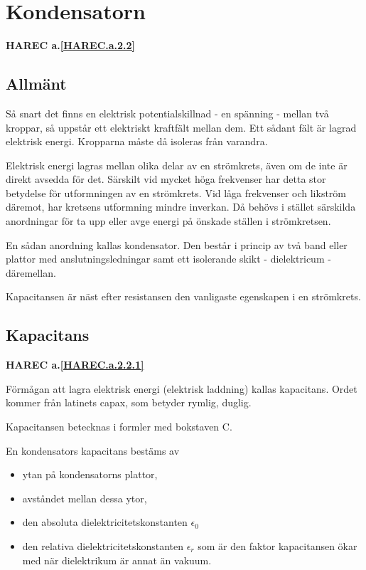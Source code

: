 \section{Kondensatorn}
\textbf{HAREC a.\ref{HAREC.a.2.2}\label{myHAREC.a.2.2}}

\subsection{Allmänt}

Så snart det finns en elektrisk potentialskillnad - en spänning - mellan två
kroppar, så uppstår ett elektriskt kraftfält mellan dem. Ett sådant fält är
lagrad elektrisk energi. Kropparna måste då isoleras från varandra.

Elektrisk energi lagras mellan olika delar av en strömkrets, även om de inte är
direkt avsedda för det. Särskilt vid mycket höga frekvenser har detta stor
betydelse för utformningen av en strömkrets. Vid låga frekvenser och likström
däremot, har kretsens utformning mindre inverkan. Då behövs i stället särskilda
anordningar för ta upp eller avge energi på önskade ställen i strömkretsen.

En sådan anordning kallas kondensator. Den består i princip av två band eller
plattor med anslutningsledningar samt ett isolerande skikt - dielektricum -
däremellan.

Kapacitansen är näst efter resistansen den vanligaste egenskapen i en
strömkrets.

\subsection{Kapacitans}
\textbf{HAREC a.\ref{HAREC.a.2.2.1}\label{myHAREC.a.2.2.1}}

Förmågan att lagra elektrisk energi (elektrisk laddning) kallas kapacitans.
Ordet kommer från latinets capax, som betyder rymlig, duglig.

Kapacitansen betecknas i formler med bokstaven C.

En kondensators kapacitans bestäms av
\begin{itemize}
  \item ytan på kondensatorns plattor,
  \item avståndet mellan dessa ytor,
  \item den absoluta dielektricitetskonstanten \(\epsilon_0\)
  \item den relativa dielektricitetskonstanten \(\epsilon_r\) som är den faktor
kapacitansen ökar med när dielektrikum är annat än vakuum.
\end{itemize}


